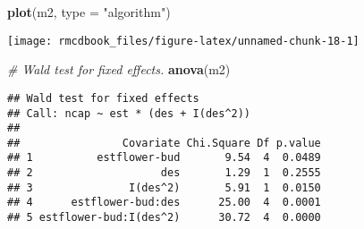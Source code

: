\documentclass[9pt,a5paper,]{book}
\newenvironment{Shaded}{}{}
\newcommand{\KeywordTok}[1]{\textbf{{#1}}}
\newcommand{\DataTypeTok}[1]{\underline{{#1}}}
\newcommand{\StringTok}[1]{{#1}}
\newcommand{\CommentTok}[1]{\textit{{#1}}}
\newcommand{\NormalTok}[1]{{#1}}
\renewenvironment{Shaded}{\color{inputcolor}}{}
\renewcommand{\DataTypeTok}[1]{{#1}}
\theoremstyle{definition}
\theoremstyle{definition}
\theoremstyle{remark}
\begin{document}
\begin{Shaded}
\begin{Highlighting}[]
\KeywordTok{plot}\NormalTok{(m2, }\DataTypeTok{type =} \StringTok{"algorithm"}\NormalTok{)}
\end{Highlighting}
\end{Shaded}

\begin{center}\texttt{[image: rmcdbook\_files/figure-latex/unnamed-chunk-18-1]} \end{center}

\begin{Shaded}
\begin{Highlighting}[]
\CommentTok{# Wald test for fixed effects.}
\KeywordTok{anova}\NormalTok{(m2)}
\end{Highlighting}
\end{Shaded}

\begin{verbatim}
## Wald test for fixed effects
## Call: ncap ~ est * (des + I(des^2))
## 
##                Covariate Chi.Square Df p.value
## 1          estflower-bud       9.54  4  0.0489
## 2                    des       1.29  1  0.2555
## 3               I(des^2)       5.91  1  0.0150
## 4      estflower-bud:des      25.00  4  0.0001
## 5 estflower-bud:I(des^2)      30.72  4  0.0000
\end{verbatim}
\end{document}
